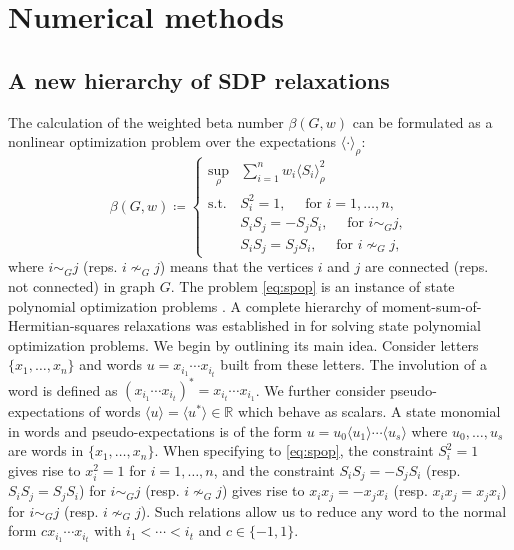 \section{Numerical methods}\label{sec:numtools}
\subsection{A new hierarchy of SDP relaxations}\label{ssec:spo}
The calculation of the weighted beta number $\beta(G,w)$ can be formulated as a nonlinear optimization problem over the expectations $\langle\cdot\rangle_\rho$:
\begin{equation}\label{eq:spop}
\beta(G,w) \coloneqq \begin{cases}\sup_\rho &\sum_{i=1}^n w_i\langle S_i \rangle_\rho^2\\
\textrm{s.t.}&S_i^2=1,\quad\text{ for }i=1,\ldots,n,\\
&S_iS_j=-S_jS_i,\quad\text{ for }i\sim_{G} j,\\
&S_iS_j=S_jS_i,\quad\text{ for }i\nsim_{G} j,
\end{cases}
\end{equation}
where $i\sim_{G} j$ (reps. $i\nsim_{G} j$) means that the vertices $i$ and $j$ are connected (reps. not connected) in graph $G$.
The problem \eqref{eq:spop} is an instance of state polynomial optimization problems \cite{klep2024state}.
A complete hierarchy of moment-sum-of-Hermitian-squares relaxations was established in \cite{klep2024state} for solving state polynomial optimization problems. We begin by outlining its main idea. Consider letters $\{x_1,\ldots,x_n\}$ and words $u=x_{i_1}\cdots x_{i_t}$ built from these letters. The involution of a word is defined as $(x_{i_1}\cdots x_{i_t})^*=x_{i_t}\cdots x_{i_1}$.
We further consider pseudo-expectations of words $\langle u\rangle=\langle u^*\rangle\in\mathbb{R}$ which behave as scalars. A state monomial in words and pseudo-expectations is of the form $u=u_0\langle u_1\rangle\cdots\langle u_s\rangle$ where $u_0,\ldots,u_s$ are words in $\{x_1,\ldots,x_n\}$. 
When specifying to \eqref{eq:spop}, the constraint $S_i^2=1$ gives rise to $x_i^2=1$ for $i=1,\ldots,n$, and the constraint $S_iS_j=-S_jS_i$ (resp. $S_iS_j=S_jS_i$) for $i\sim_{G} j$ (resp. $i\nsim_{G} j$) gives rise to $x_ix_j=-x_jx_i$ (resp. $x_ix_j=x_jx_i$) for $i\sim_{G} j$ (resp. $i\nsim_{G} j$). Such relations allow us to reduce any word to the normal form $cx_{i_1}\cdots x_{i_t}$ with $i_1<\cdots<i_t$ and $c\in\{-1,1\}$. 

